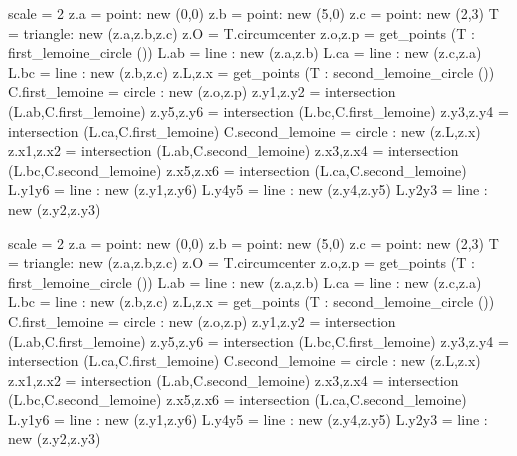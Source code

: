 \begin{tkzexample}[latex=0cm,small,code only]
\begin{tkzelements}
   scale             = 2
   z.a               = point:  new (0,0)
   z.b               = point:  new (5,0)
   z.c               = point:  new (2,3)
   T                 = triangle: new (z.a,z.b,z.c)
   z.O               = T.circumcenter
   z.o,z.p           = get_points (T : first_lemoine_circle ())
   L.ab              = line : new (z.a,z.b)
   L.ca              = line : new (z.c,z.a)
   L.bc              = line : new (z.b,z.c)
   z.L,z.x           = get_points (T : second_lemoine_circle ())
   C.first_lemoine   = circle : new (z.o,z.p)
   z.y1,z.y2         = intersection (L.ab,C.first_lemoine)
   z.y5,z.y6         = intersection (L.bc,C.first_lemoine)
   z.y3,z.y4         = intersection (L.ca,C.first_lemoine)
   C.second_lemoine  = circle : new (z.L,z.x)
   z.x1,z.x2         = intersection (L.ab,C.second_lemoine)
   z.x3,z.x4         = intersection (L.bc,C.second_lemoine)
   z.x5,z.x6         = intersection (L.ca,C.second_lemoine)
   L.y1y6            = line : new (z.y1,z.y6)
   L.y4y5            = line : new (z.y4,z.y5)
   L.y2y3            = line : new (z.y2,z.y3)
\end{tkzelements}
\end{tkzexample}

\begin{tkzelements}
scale     = 2
z.a   = point:  new (0,0)
z.b   = point:  new (5,0)
z.c   = point:  new (2,3)
T     = triangle: new (z.a,z.b,z.c)
z.O   = T.circumcenter
z.o,z.p   = get_points (T : first_lemoine_circle ())
L.ab      = line : new (z.a,z.b)
L.ca      = line : new (z.c,z.a)
L.bc      = line : new (z.b,z.c)
z.L,z.x   = get_points (T : second_lemoine_circle ())
C.first_lemoine   = circle : new (z.o,z.p)
z.y1,z.y2     = intersection (L.ab,C.first_lemoine)
z.y5,z.y6     = intersection (L.bc,C.first_lemoine)
z.y3,z.y4     = intersection (L.ca,C.first_lemoine)
C.second_lemoine  = circle : new (z.L,z.x)
z.x1,z.x2     = intersection (L.ab,C.second_lemoine)
z.x3,z.x4     = intersection (L.bc,C.second_lemoine)
z.x5,z.x6     = intersection (L.ca,C.second_lemoine)
L.y1y6    = line : new (z.y1,z.y6)
L.y4y5    = line : new (z.y4,z.y5)
L.y2y3    = line : new (z.y2,z.y3)
\end{tkzelements}

